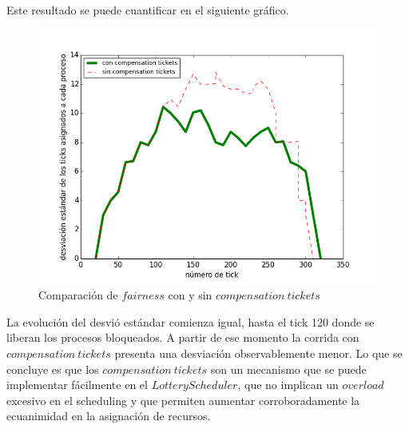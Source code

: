 \documentclass[a4paper]{article}
\begin{document}
Este resultado se puede cuantificar en el siguiente gráfico.

\begin{figure}[H]
\centering
\includegraphics[scale=0.66]{../experimentacion/ej10-compensation/plot-comparativa.png}
\caption{Comparación de $fairness$ con y sin $compensation\ tickets$}
\end{figure}

La evolución del desvió estándar comienza igual, hasta el tick 120 donde se liberan los procesos bloqueados. A partir de ese momento la corrida con $compensation\ tickets$ presenta una desviación observablemente menor. Lo que se concluye es que los $compensation\ tickets$ son un mecanismo que se puede implementar fácilmente en el $Lottery Scheduler$, que no implican un $overload$ excesivo en el scheduling y que permiten aumentar corroboradamente la ecuanimidad en la asignación de recursos.
\end{document}
